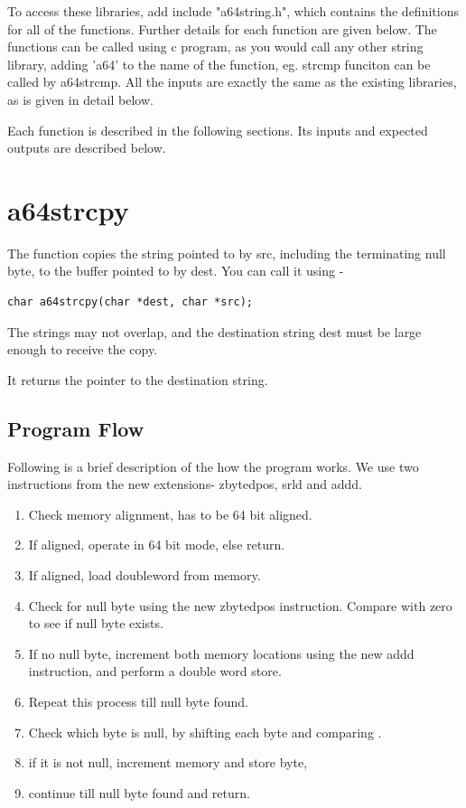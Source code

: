 \documentclass[12pt]{article}
\begin{document}
To access these libraries, add include "a64string.h", which contains the definitions for all of the functions. Further details for each function are given below.\newline
The functions can be called using  c program, as you would call any other string library, adding 'a64' to the name of the function, eg. strcmp funciton can be called by a64strcmp. All the inputs are exactly the same as the existing libraries, as is given in detail below.


Each function is described in the following sections. Its inputs and expected outputs are described below.


\section{a64strcpy}
The function copies the string pointed to by src, including the terminating null byte, to the buffer pointed to by dest. You can call it using -
\begin{verbatim}
char a64strcpy(char *dest, char *src);
\end{verbatim}
The strings may not overlap, and the destination string dest must be large enough to receive the copy.

It returns the pointer to the destination string.


\subsection{Program Flow}

Following is a brief description of the how the program works. We use two instructions from the new extensions- zbytedpos, srld and addd. 

\begin{enumerate}
    \item Check memory alignment, has to be 64 bit aligned.
    \item If aligned, operate in 64 bit mode, else return.
    \item If aligned, load doubleword from memory.
    \item Check for null byte using the new zbytedpos instruction. Compare with zero to see if null byte exists.
    \item If no null byte, increment both memory locations using the new addd instruction, and perform a double word store.
    \item Repeat this process till null byte found.
    \item Check which byte is null, by shifting each byte and comparing .
    \item if it is not null, increment memory and store byte,
    \item continue till null byte found and return.
\end{enumerate}
\end{document}
